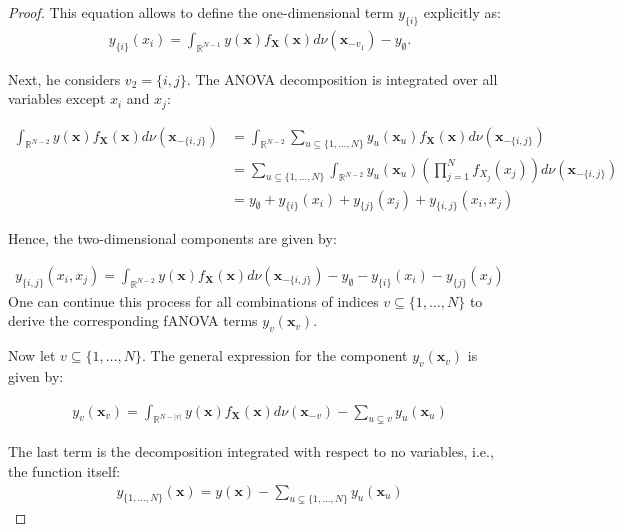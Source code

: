 \begin{proof}
This equation allows to define the one-dimensional term \( y_{\{i\}} \) explicitly as:
\begin{align*}
    y_{\{i\}}(x_i) = \int_{\mathbb{R}^{N-1}} y(\boldsymbol{x}) f_{\boldsymbol{X}}(\boldsymbol{x}) d\nu (\boldsymbol{x}_{-v_1}) - y_{\emptyset}.
\end{align*}

Next, he considers $v_2 = \{i, j\}$. The ANOVA decomposition is integrated over all variables except $x_i$ and $x_j$:

\begin{align*}
    \int_{\mathbb{R}^{N-2}} y(\boldsymbol{x}) f_{\boldsymbol{X}}(\boldsymbol{x}) d\nu(\boldsymbol{x}_{-\{i,j\}}) 
    &= \int_{\mathbb{R}^{N-2}} \sum_{u \subseteq \{1, \dots, N\}} y_u(\boldsymbol{x}_u) f_{\boldsymbol{X}}(\boldsymbol{x}) d\nu(\boldsymbol{x}_{-\{i,j\}}) \\
    &= \sum_{u \subseteq \{1, \dots, N\}} \int_{\mathbb{R}^{N-2}} y_u(\boldsymbol{x}_u) \left( \prod_{j=1}^N f_{X_j}(x_j) \right) d\nu(\boldsymbol{x}_{-\{i,j\}}) \\
    &= y_{\emptyset} + y_{\{i\}}(x_i) + y_{\{j\}}(x_j) + y_{\{i,j\}}(x_i, x_j)
\end{align*}

Hence, the two-dimensional components are given by:

\begin{align*}
    y_{\{i,j\}}(x_i, x_j) 
    = \int_{\mathbb{R}^{N-2}} y(\boldsymbol{x}) f_{\boldsymbol{X}}(\boldsymbol{x}) d\nu(\boldsymbol{x}_{-\{i,j\}})
    - y_{\emptyset} - y_{\{i\}}(x_i) - y_{\{j\}}(x_j)
\end{align*}
One can continue this process for all combinations of indices \( v \subseteq \{1, \ldots, N\} \) to derive the corresponding fANOVA terms \( y_v(\boldsymbol{x}_v) \).\par
Now let \( v \subseteq \{1, \ldots, N\} \). The general expression for the component \( y_v(\boldsymbol{x}_v) \) is given by:

\begin{align*}
    y_v(\boldsymbol{x}_v) = \int_{\mathbb{R}^{N - |v|}} y(\boldsymbol{x}) f_{\boldsymbol{X}}(\boldsymbol{x}) d\nu(\boldsymbol{x}_{-v}) 
    - \sum_{u \subsetneq v} y_u(\boldsymbol{x}_u)
\end{align*}

The last term is the decomposition integrated with respect to no variables, i.e., the function itself:
\begin{align*}
    y_{\{1, \ldots, N\}}(\boldsymbol{x}) = y(\boldsymbol{x}) 
    - \sum_{u \subsetneq \{1, \ldots, N\}} y_u(\boldsymbol{x}_u)
\end{align*}


\end{proof}

